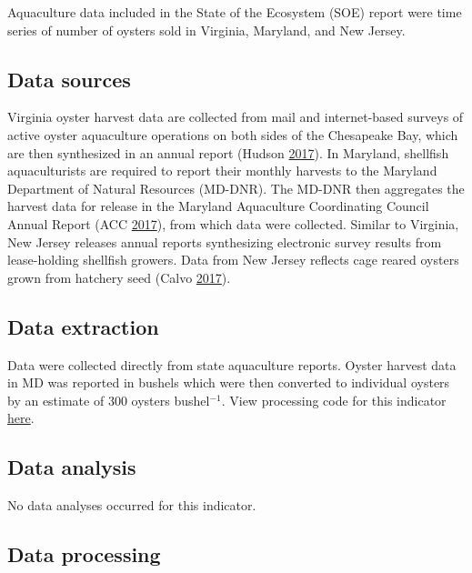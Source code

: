 \documentclass[
]{book}
\begin{document}
Aquaculture data included in the State of the Ecosystem (SOE) report were time series of number of oysters sold in Virginia, Maryland, and New Jersey.

\hypertarget{data-sources-2}{%
\subsection{Data sources}\label{data-sources-2}}

Virginia oyster harvest data are collected from mail and internet-based surveys of active oyster aquaculture operations on both sides of the Chesapeake Bay, which are then synthesized in an annual report (Hudson \protect\hyperlink{ref-Hudson2017a}{2017}). In Maryland, shellfish aquaculturists are required to report their monthly harvests to the Maryland Department of Natural Resources (MD-DNR). The MD-DNR then aggregates the harvest data for release in the Maryland Aquaculture Coordinating Council Annual Report (ACC \protect\hyperlink{ref-ACC2017}{2017}), from which data were collected. Similar to Virginia, New Jersey releases annual reports synthesizing electronic survey results from lease-holding shellfish growers. Data from New Jersey reflects cage reared oysters grown from hatchery seed (Calvo \protect\hyperlink{ref-Calvo2017}{2017}).

\hypertarget{data-extraction-2}{%
\subsection{Data extraction}\label{data-extraction-2}}

Data were collected directly from state aquaculture reports. Oyster harvest data in MD was reported in bushels which were then converted to individual oysters by an estimate of 300 oysters bushel\(^{-1}\). View processing code for this indicator \href{https://github.com/NOAA-EDAB/ecodata/blob/master/data-raw/get_aquaculture.R}{here}.

\hypertarget{data-analysis-1}{%
\subsection{Data analysis}\label{data-analysis-1}}

No data analyses occurred for this indicator.

\hypertarget{data-processing}{%
\subsection{Data processing}\label{data-processing}}
\end{document}
